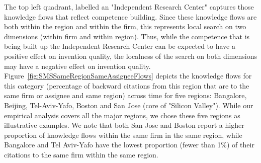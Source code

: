 \documentclass[parskip=full,10pt,letterpaper]{article}
\begin{document}
The top left quadrant, labelled an "Independent Research Center" captures those knowledge flows that reflect competence building. Since these knowledge flows  are both within the region and within the firm, this represents local search on two dimensions (within firm and within region).  Thus, while the competence that is being built up the Independent Research Center can be expected to have a positive effect on invention quality, the localness of the search on both dimensions may have a negative effect on invention quality. Figure~\ref{fig:SMSSameRegionSameAssigneeFlows} depicts the knowledge flows for this category (percentage of backward citations from this region that are to the same firm or assignee and same region) across time for five regions: Bangalore, Beijing, Tel-Aviv-Yafo, Boston and San Jose (core of "Silicon Valley"). While our empirical analysis covers all the major regions, we chose these five regions as illustrative examples. We note that both San Jose and Boston report a higher proportion of knowledge flows within the same firm in the same region, while Bangalore and Tel Aviv-Yafo have the lowest proportion (fewer than 1\%) of their citations to the same firm within the same region. \par
\end{document}
